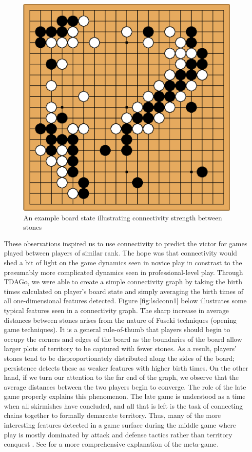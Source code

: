 \documentclass[11pt]{article}
\begin{document}
\begin{figure}[ht]
  \centering
  \includegraphics[scale=0.5]{conn1.png}
  \caption{An example board state illustrating connectivity strength between stones}
  \label{fig:conn1}
\end{figure}

These observations inspired us to use connectivity to predict the victor for games played between players of similar rank. The hope was that connectivity would shed a bit of light on the game dynamics seen in novice play in constrast to the presumably more complicated dynamics seen in professional-level play. Through TDAGo, we were able to create a simple connectivity graph by taking the birth times calculated on player's board state and simply averaging the birth times of all one-dimensional features detected. Figure \ref{fig:lsdconn1} below illustrates some typical features seen in a connectivity graph. The sharp increase in average distances between stones arises from the nature of Fuseki techniques (opening game techniques). It is a general rule-of-thumb that players should begin to occupy the corners and edges of the board as the boundaries of the board allow larger plots of territory to be captured with fewer stones. As a result, players' stones tend to be disproportionately distributed along the sides of the board; persistence detects these as weaker features with higher birth times. On the other hand, if we turn our attention to the far end of the graph, we observe that the average distances between the two players begin to converge. The role of the late game properly explains this phenomenon. The late game is understood as a time when all skirmishes have concluded, and all that is left is the task of connecting chains together to formally demarcate territory. Thus, many of the more interesting features detected in a game surface during the middle game where play is mostly dominated by attack and defense tactics rather than territory conquest \cite{terms}. See \cite{terms} for a more comprehensive explanation of the meta-game.
\end{document}
